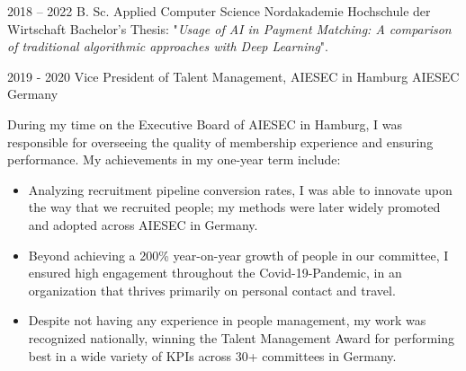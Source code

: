 \documentclass[9pt]{developercv} %
\begin{document}
%

    \pagebreak

    \begin{entrylist}
        \entry
        {2018 -- 2022}
        {B. Sc. Applied Computer Science}
        {Nordakademie Hochschule der Wirtschaft}
        {Bachelor's Thesis: "\textit{Usage of AI in Payment Matching: A comparison of traditional algorithmic approaches with Deep Learning}".}
    \end{entrylist}




    \begin{entrylist}
        \entry
        {2019 - 2020}
        {Vice President of Talent Management, AIESEC in Hamburg}
        {AIESEC Germany}
        {During my time on the Executive Board of AIESEC in Hamburg, I was responsible for overseeing the quality of membership experience and ensuring performance. My achievements in my one-year term include:

            \begin{itemize}
                \item Analyzing recruitment pipeline conversion rates, I was able to innovate upon the way that we recruited people; my methods were later widely promoted and adopted across AIESEC in Germany.
                \item Beyond achieving a 200\% year-on-year growth of people in our committee, I ensured high engagement throughout the Covid-19-Pandemic, in an organization that thrives primarily on personal contact and travel.
                \item Despite not having any experience in people management, my work was recognized nationally, winning the Talent Management Award for performing best in a wide variety of KPIs across 30+ committees in Germany.
            \end{itemize}
        }
    \end{entrylist}

\end{document}
